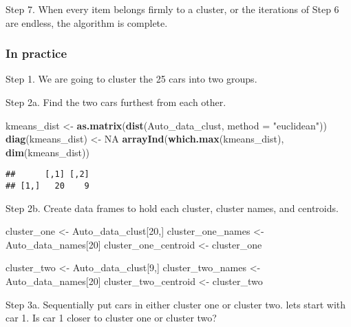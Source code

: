 \documentclass[11pt,]{article}
\newenvironment{Shaded}{\begin{snugshade}}{\end{snugshade}}
\newcommand{\DataTypeTok}[1]{\textcolor[rgb]{0.13,0.29,0.53}{#1}}
\newcommand{\DecValTok}[1]{\textcolor[rgb]{0.00,0.00,0.81}{#1}}
\newcommand{\KeywordTok}[1]{\textcolor[rgb]{0.13,0.29,0.53}{\textbf{#1}}}
\newcommand{\NormalTok}[1]{#1}
\newcommand{\OtherTok}[1]{\textcolor[rgb]{0.56,0.35,0.01}{#1}}
\newcommand{\StringTok}[1]{\textcolor[rgb]{0.31,0.60,0.02}{#1}}
\begin{document}
Step 7. When every item belongs firmly to a cluster, or the iterations
of Step 6 are endless, the algorithm is complete.

\hypertarget{in-practice-1}{%
\subsubsection{In practice}\label{in-practice-1}}

Step 1. We are going to cluster the 25 cars into two groups.

Step 2a. Find the two cars furthest from each other.

\begin{Shaded}
\begin{Highlighting}[]
\NormalTok{kmeans_dist <-}\StringTok{ }\KeywordTok{as.matrix}\NormalTok{(}\KeywordTok{dist}\NormalTok{(Auto_data_clust, }\DataTypeTok{method =} \StringTok{"euclidean"}\NormalTok{))}
\KeywordTok{diag}\NormalTok{(kmeans_dist) <-}\StringTok{ }\OtherTok{NA}
\KeywordTok{arrayInd}\NormalTok{(}\KeywordTok{which.max}\NormalTok{(kmeans_dist), }\KeywordTok{dim}\NormalTok{(kmeans_dist))}
\end{Highlighting}
\end{Shaded}

\begin{verbatim}
##      [,1] [,2]
## [1,]   20    9
\end{verbatim}

Step 2b. Create data frames to hold each cluster, cluster names, and
centroids.

\begin{Shaded}
\begin{Highlighting}[]
\NormalTok{cluster_one <-}\StringTok{ }\NormalTok{Auto_data_clust[}\DecValTok{20}\NormalTok{,]}
\NormalTok{cluster_one_names <-}\StringTok{ }\NormalTok{Auto_data_names[}\DecValTok{20}\NormalTok{]}
\NormalTok{cluster_one_centroid <-}\StringTok{ }\NormalTok{cluster_one}

\NormalTok{cluster_two <-}\StringTok{ }\NormalTok{Auto_data_clust[}\DecValTok{9}\NormalTok{,]}
\NormalTok{cluster_two_names <-}\StringTok{ }\NormalTok{Auto_data_names[}\DecValTok{20}\NormalTok{]}
\NormalTok{cluster_two_centroid <-}\StringTok{ }\NormalTok{cluster_two}
\end{Highlighting}
\end{Shaded}

Step 3a. Sequentially put cars in either cluster one or cluster two.
lets start with car 1. Is car 1 closer to cluster one or cluster two?
\end{document}
